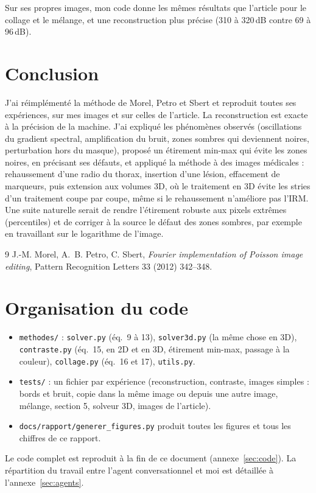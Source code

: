 \documentclass[11pt,a4paper]{article}
\begin{document}
Sur ses propres images, mon code donne les mêmes résultats que l'article pour le collage et le mélange,
et une reconstruction plus précise (310 à 320\,dB contre 69 à 96\,dB).

\section{Conclusion}

J'ai réimplémenté la méthode de Morel, Petro et Sbert et reproduit toutes ses expériences, sur mes images
et sur celles de l'article. La reconstruction est exacte à la précision de la machine. J'ai expliqué les
phénomènes observés (oscillations du gradient spectral, amplification du bruit, zones sombres qui deviennent noires, perturbation hors du masque), proposé un
étirement min-max qui évite les zones noires, en précisant ses défauts, et appliqué la
méthode à des images médicales : rehaussement d'une radio du thorax, insertion d'une lésion, effacement de
marqueurs, puis extension aux volumes 3D, où le traitement en 3D évite les stries d'un
traitement coupe par coupe, même si le rehaussement n'améliore pas l'IRM. Une suite naturelle serait de
rendre l'étirement robuste aux pixels extrêmes (percentiles) et de corriger à la source le défaut des
zones sombres, par exemple en travaillant sur le logarithme de l'image.

\begin{thebibliography}{9}
 J.-M. Morel, A.~B. Petro, C. Sbert, \emph{Fourier implementation of Poisson image
editing}, Pattern Recognition Letters 33 (2012) 342--348.
\end{thebibliography}

\appendix
\section{Organisation du code}

\begin{itemize}
  \item \texttt{methodes/} : \texttt{solver.py} (éq.~9 à 13), \texttt{solver3d.py} (la même chose en 3D),
  \texttt{contraste.py} (éq.~15, en 2D et en 3D, étirement min-max, passage à la couleur),
  \texttt{collage.py} (éq.~16 et 17), \texttt{utils.py}.
  \item \texttt{tests/} : un fichier par expérience (reconstruction, contraste, images simples : bords
  et bruit, copie dans la même image ou depuis une autre image, mélange, section 5, solveur 3D,
  images de l'article).
  \item \texttt{docs/rapport/generer\_figures.py} produit toutes les figures et tous les chiffres de ce
  rapport.
\end{itemize}
Le code complet est reproduit à la fin de ce document (annexe~\ref{sec:code}). La répartition du travail
entre l'agent conversationnel et moi est détaillée à l'annexe~\ref{sec:agents}.
\end{document}

